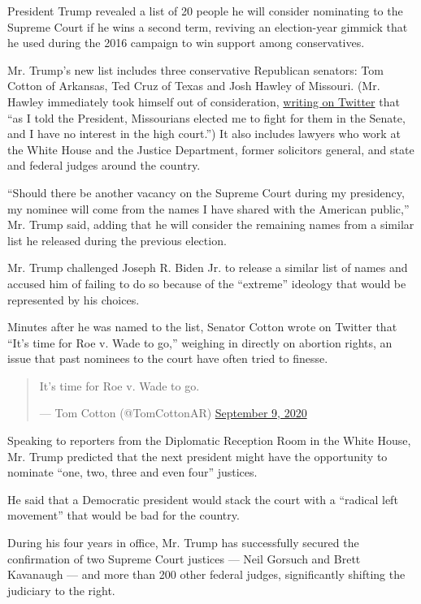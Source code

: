 President Trump revealed a list of 20 people he will consider nominating
to the Supreme Court if he wins a second term, reviving an election-year
gimmick that he used during the 2016 campaign to win support among
conservatives.

Mr. Trump's new list includes three conservative Republican senators:
Tom Cotton of Arkansas, Ted Cruz of Texas and Josh Hawley of Missouri.
(Mr. Hawley immediately took himself out of consideration,
\href{https://twitter.com/HawleyMO/status/1303787915668074497?s=20}{writing
on Twitter} that ``as I told the President, Missourians elected me to
fight for them in the Senate, and I have no interest in the high
court.'') It also includes lawyers who work at the White House and the
Justice Department, former solicitors general, and state and federal
judges around the country.

``Should there be another vacancy on the Supreme Court during my
presidency, my nominee will come from the names I have shared with the
American public,'' Mr. Trump said, adding that he will consider the
remaining names from a similar list he released during the previous
election.

Mr. Trump challenged Joseph R. Biden Jr. to release a similar list of
names and accused him of failing to do so because of the ``extreme''
ideology that would be represented by his choices.

Minutes after he was named to the list, Senator Cotton wrote on Twitter
that ``It's time for Roe v. Wade to go,'' weighing in directly on
abortion rights, an issue that past nominees to the court have often
tried to finesse.

\begin{quote}
It's time for Roe v. Wade to go.

--- Tom Cotton (@TomCottonAR)
\href{https://twitter.com/TomCottonAR/status/1303786807692124160?ref_src=twsrc\%5Etfw}{September
9, 2020}
\end{quote}

Speaking to reporters from the Diplomatic Reception Room in the White
House, Mr. Trump predicted that the next president might have the
opportunity to nominate ``one, two, three and even four'' justices.

He said that a Democratic president would stack the court with a
``radical left movement'' that would be bad for the country.

During his four years in office, Mr. Trump has successfully secured the
confirmation of two Supreme Court justices --- Neil Gorsuch and Brett
Kavanaugh --- and more than 200 other federal judges, significantly
shifting the judiciary to the right.

